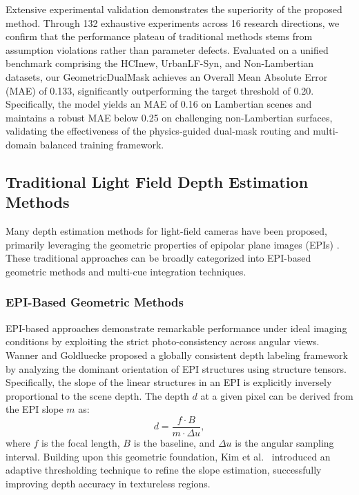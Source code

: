 \documentclass[lettersize,journal]{IEEEtran}
\begin{document}
Extensive experimental validation demonstrates the superiority of the proposed method. Through 132 exhaustive experiments across 16 research directions, we confirm that the performance plateau of traditional methods stems from assumption violations rather than parameter defects. Evaluated on a unified benchmark comprising the HCInew, UrbanLF-Syn, and Non-Lambertian datasets, our GeometricDualMask achieves an Overall Mean Absolute Error (MAE) of 0.133, significantly outperforming the target threshold of 0.20. Specifically, the model yields an MAE of 0.16 on Lambertian scenes and maintains a robust MAE below 0.25 on challenging non-Lambertian surfaces, validating the effectiveness of the physics-guided dual-mask routing and multi-domain balanced training framework.


\subsection{Traditional Light Field Depth Estimation Methods}

Many depth estimation methods for light-field cameras have been proposed, primarily leveraging the geometric properties of epipolar plane images (EPIs) \cite{bolles1987epipolar, wanner2012globally}. These traditional approaches can be broadly categorized into EPI-based geometric methods and multi-cue integration techniques.

\subsubsection{EPI-Based Geometric Methods}
EPI-based approaches demonstrate remarkable performance under ideal imaging conditions by exploiting the strict photo-consistency across angular views. Wanner and Goldluecke \cite{wanner2012globally} proposed a globally consistent depth labeling framework by analyzing the dominant orientation of EPI structures using structure tensors. Specifically, the slope of the linear structures in an EPI is explicitly inversely proportional to the scene depth. The depth $d$ at a given pixel can be derived from the EPI slope $m$ as:
\begin{equation}
d = \frac{f \cdot B}{m \cdot \Delta u},
\label{eq:ch2_1}
\end{equation}
where $f$ is the focal length, $B$ is the baseline, and $\Delta u$ is the angular sampling interval. Building upon this geometric foundation, Kim et al.\ \cite{kim2013adaptive} introduced an adaptive thresholding technique to refine the slope estimation, successfully improving depth accuracy in textureless regions. 
\end{document}
